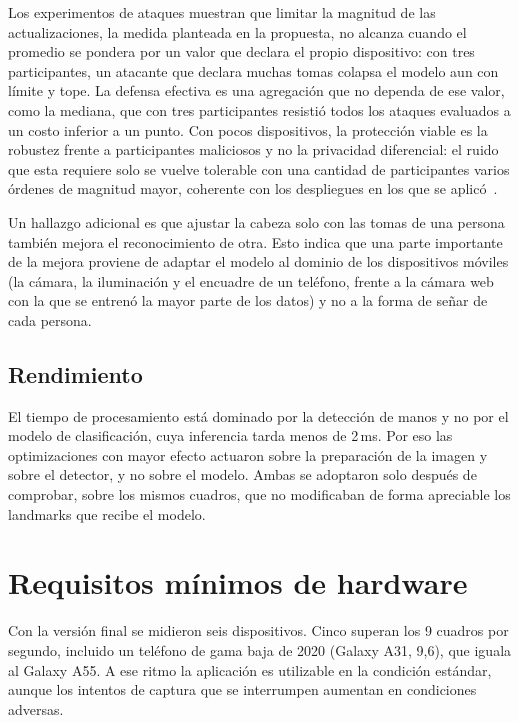 Los experimentos de ataques muestran que limitar la magnitud de las actualizaciones, la medida planteada en la propuesta, no alcanza cuando el promedio se pondera por un valor que declara el propio dispositivo: con tres participantes, un atacante que declara muchas tomas colapsa el modelo aun con límite y tope. La defensa efectiva es una agregación que no dependa de ese valor, como la mediana, que con tres participantes resistió todos los ataques evaluados a un costo inferior a un punto. Con pocos dispositivos, la protección viable es la robustez frente a participantes maliciosos y no la privacidad diferencial: el ruido que esta requiere solo se vuelve tolerable con una cantidad de participantes varios órdenes de magnitud mayor, coherente con los despliegues en los que se aplicó~\cite{mcmahan2018dp}.

Un hallazgo adicional es que ajustar la cabeza solo con las tomas de una persona también mejora el reconocimiento de otra. Esto indica que una parte importante de la mejora proviene de adaptar el modelo al dominio de los dispositivos móviles (la cámara, la iluminación y el encuadre de un teléfono, frente a la cámara web con la que se entrenó la mayor parte de los datos) y no a la forma de señar de cada persona.

\subsection{Rendimiento}

El tiempo de procesamiento está dominado por la detección de manos y no por el modelo de clasificación, cuya inferencia tarda menos de 2\,ms. Por eso las optimizaciones con mayor efecto actuaron sobre la preparación de la imagen y sobre el detector, y no sobre el modelo. Ambas se adoptaron solo después de comprobar, sobre los mismos cuadros, que no modificaban de forma apreciable los landmarks que recibe el modelo.

\section{Requisitos mínimos de hardware}

Con la versión final se midieron seis dispositivos. Cinco superan los 9 cuadros por segundo, incluido un teléfono de gama baja de 2020 (Galaxy A31, 9,6), que iguala al Galaxy A55. A ese ritmo la aplicación es utilizable en la condición estándar, aunque los intentos de captura que se interrumpen aumentan en condiciones adversas.


